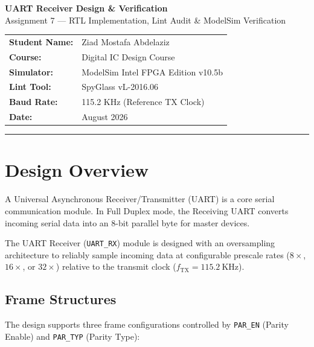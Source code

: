 \documentclass[12pt,a4paper]{article}
\begin{document}
\begin{titlepage}
\centering
\vspace*{2cm}
{\Huge\bfseries\color{headerblue} UART Receiver Design \& Verification\\[0.5em]}
{\Large\color{gray} Assignment 7 — RTL Implementation, Lint Audit \& ModelSim Verification\\[3cm]}

\begin{tabular}{ll}
\textbf{Student Name:} & Ziad Mostafa Abdelaziz \\[0.5em]
\textbf{Course:}       & Digital IC Design Course \\[0.5em]
\textbf{Simulator:}    & ModelSim Intel FPGA Edition v10.5b \\[0.5em]
\textbf{Lint Tool:}    & SpyGlass vL-2016.06 \\[0.5em]
\textbf{Baud Rate:}    & 115.2 KHz (Reference TX Clock) \\[0.5em]
\textbf{Date:}         & August 2026 \\
\end{tabular}

\vfill
\rule{\linewidth}{1pt}
\end{titlepage}

\tableofcontents
\newpage

\section{Design Overview}

A Universal Asynchronous Receiver/Transmitter (UART) is a core serial communication module. In Full Duplex mode, the Receiving UART converts incoming serial data into an 8-bit parallel byte for master devices.

The UART Receiver (\texttt{UART\_RX}) module is designed with an oversampling architecture to reliably sample incoming data at configurable prescale rates ($8\times$, $16\times$, or $32\times$) relative to the transmit clock ($f_{\text{TX}} = 115.2~\text{KHz}$).

\subsection{Frame Structures}

The design supports three frame configurations controlled by \texttt{PAR\_EN} (Parity Enable) and \texttt{PAR\_TYP} (Parity Type):
\end{document}

